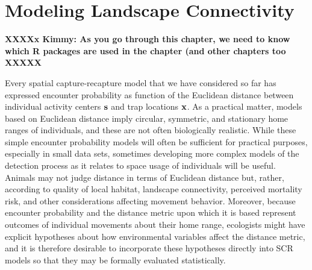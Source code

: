 \chapter{
Modeling Landscape Connectivity 
}
\label{chapt.ecoldist}


\vspace{.3in}

{\bf XXXXx Kimmy: As you go through this chapter, we need to know
  which R packages are used in the chapter (and other chapters too XXXXX}


Every spatial capture-recapture model that we have considered so far
has expressed encounter probability as function of the Euclidean
distance between individual activity centers ${\bf s}$ and trap
locations ${\bf x}$.  As a practical matter, models based on Euclidean
distance imply circular, symmetric, and stationary home ranges of
individuals, and these are not often biologically realistic.  While
these simple encounter probability models will often be sufficient for
practical purposes, especially in small data sets, sometimes
developing more complex models of the detection process as it relates
to space usage of individuals will be useful.  Animals may not judge
distance in terms of Euclidean distance but, rather, according to
quality of local habitat, landscape connectivity, perceived mortality
risk, and other considerations affecting movement behavior.  Moreover,
because encounter probability and the distance metric upon which it is
based represent outcomes of individual movements about their home
range, ecologists might have explicit hypotheses about how
environmental variables affect the distance metric, and it is
therefore desirable to incorporate these hypotheses directly into SCR
models so that they may be formally evaluated statistically.


